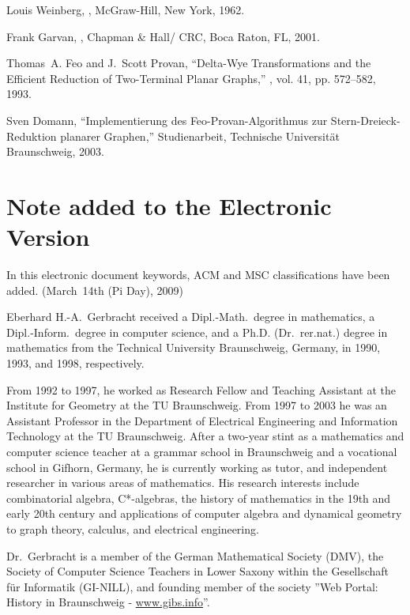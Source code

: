 \documentclass[10pt,twocolumn,pagenumbers]{IEEEtran}
\begin{document}
\begin{thebibliography}{10}
Louis Weinberg,
,
\newblock McGraw-Hill, New York, 1962.

Frank Garvan,
,
\newblock Chapman \& Hall/ CRC, Boca Raton, FL, 2001.

Thomas~A. Feo and J.~Scott Provan,
\newblock ``Delta-{W}ye {T}ransformations and the {E}fficient {R}eduction of
  {T}wo-{T}erminal {P}lanar {G}raphs,''
, vol. 41, pp. 572--582, 1993.

Sven Domann,
\newblock ``Implementierung des {F}eo-{P}rovan-{A}lgorithmus zur
  {S}tern-{D}reieck-{R}eduktion planarer {G}raphen,'' Studienarbeit, Technische
  Universit\"at Braunschweig, 2003.

\end{thebibliography}



\section*{Note added to the Electronic Version}
In this electronic document keywords, ACM and MSC classifications have been added. \hfill (March~14th (Pi Day), 2009)


\begin{biography}
{Eberhard H.-A.~Gerbracht}
received a Dipl.-Math.\ degree in mathematics, a Dipl.-Inform.\ degree in computer science, and a Ph.D. (Dr.\ rer.nat.) degree in mathematics from the Technical University Braunschweig, Germany, in 1990, 1993, and 1998, respectively.

\small From 1992 to 1997,  he worked as Research Fellow and Teaching Assistant at the Institute for Geometry at the TU Braunschweig. From 1997 to 2003 he was an Assistant Professor in the Department of Electrical Engineering and Information Technology at the TU Braunschweig. After a two-year stint as a mathematics and computer science teacher at a grammar school in Braunschweig and a vocational school in Gifhorn, Germany, he is currently working as tutor, and independent researcher in various areas of mathematics. His research interests include combinatorial algebra, C*-algebras, the history of mathematics in the 19th and early 20th century and applications of computer algebra and dynamical geometry to graph theory, calculus, and electrical engineering. 

\small
Dr.~Gerbracht is a member of the German Mathematical Society (DMV), the Society of Computer Science Teachers in Lower Saxony within the Gesellschaft f\"ur Informatik (GI-NILL), and founding member of the society ''Web Portal: History in Braunschweig - \href{http://www.gibs.info}{www.gibs.info}''.

\end{biography}
\end{document}
